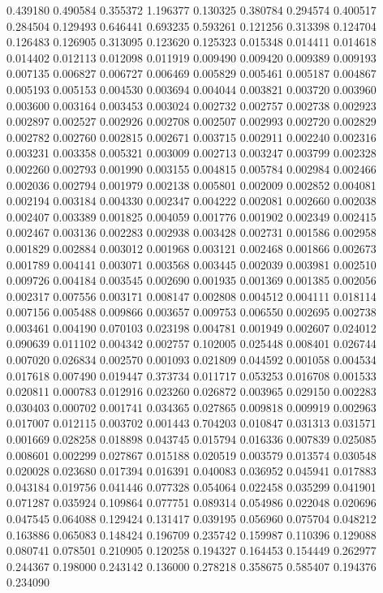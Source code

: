0.439180
0.490584
0.355372
1.196377
0.130325
0.380784
0.294574
0.400517
0.284504
0.129493
0.646441
0.693235
0.593261
0.121256
0.313398
0.124704
0.126483
0.126905
0.313095
0.123620
0.125323
0.015348
0.014411
0.014618
0.014402
0.012113
0.012098
0.011919
0.009490
0.009420
0.009389
0.009193
0.007135
0.006827
0.006727
0.006469
0.005829
0.005461
0.005187
0.004867
0.005193
0.005153
0.004530
0.003694
0.004044
0.003821
0.003720
0.003960
0.003600
0.003164
0.003453
0.003024
0.002732
0.002757
0.002738
0.002923
0.002897
0.002527
0.002926
0.002708
0.002507
0.002993
0.002720
0.002829
0.002782
0.002760
0.002815
0.002671
0.003715
0.002911
0.002240
0.002316
0.003231
0.003358
0.005321
0.003009
0.002713
0.003247
0.003799
0.002328
0.002260
0.002793
0.001990
0.003155
0.004815
0.005784
0.002984
0.002466
0.002036
0.002794
0.001979
0.002138
0.005801
0.002009
0.002852
0.004081
0.002194
0.003184
0.004330
0.002347
0.004222
0.002081
0.002660
0.002038
0.002407
0.003389
0.001825
0.004059
0.001776
0.001902
0.002349
0.002415
0.002467
0.003136
0.002283
0.002938
0.003428
0.002731
0.001586
0.002958
0.001829
0.002884
0.003012
0.001968
0.003121
0.002468
0.001866
0.002673
0.001789
0.004141
0.003071
0.003568
0.003445
0.002039
0.003981
0.002510
0.009726
0.004184
0.003545
0.002690
0.001935
0.001369
0.001385
0.002056
0.002317
0.007556
0.003171
0.008147
0.002808
0.004512
0.004111
0.018114
0.007156
0.005488
0.009866
0.003657
0.009753
0.006550
0.002695
0.002738
0.003461
0.004190
0.070103
0.023198
0.004781
0.001949
0.002607
0.024012
0.090639
0.011102
0.004342
0.002757
0.102005
0.025448
0.008401
0.026744
0.007020
0.026834
0.002570
0.001093
0.021809
0.044592
0.001058
0.004534
0.017618
0.007490
0.019447
0.373734
0.011717
0.053253
0.016708
0.001533
0.020811
0.000783
0.012916
0.023260
0.026872
0.003965
0.029150
0.002283
0.030403
0.000702
0.001741
0.034365
0.027865
0.009818
0.009919
0.002963
0.017007
0.012115
0.003702
0.001443
0.704203
0.010847
0.031313
0.031571
0.001669
0.028258
0.018898
0.043745
0.015794
0.016336
0.007839
0.025085
0.008601
0.002299
0.027867
0.015188
0.020519
0.003579
0.013574
0.030548
0.020028
0.023680
0.017394
0.016391
0.040083
0.036952
0.045941
0.017883
0.043184
0.019756
0.041446
0.077328
0.054064
0.022458
0.035299
0.041901
0.071287
0.035924
0.109864
0.077751
0.089314
0.054986
0.022048
0.020696
0.047545
0.064088
0.129424
0.131417
0.039195
0.056960
0.075704
0.048212
0.163886
0.065083
0.148424
0.196709
0.235742
0.159987
0.110396
0.129088
0.080741
0.078501
0.210905
0.120258
0.194327
0.164453
0.154449
0.262977
0.244367
0.198000
0.243142
0.136000
0.278218
0.358675
0.585407
0.194376
0.234090
